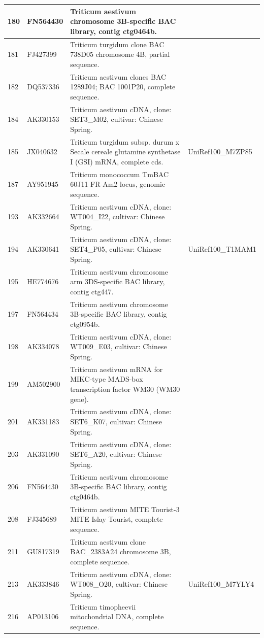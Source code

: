 \documentclass[10.9pt]{article} %
\begin{document}
{\begin{longtable}{|p{1.5cm}|p{2cm}|p{9cm}|p{3cm}|}
\hline
180 & FN564430 & Triticum aestivum chromosome 3B-specific BAC library, contig ctg0464b. & \\
\hline
181 & FJ427399 & Triticum turgidum clone BAC 738D05 chromosome 4B, partial sequence. & \\
\hline
182 & DQ537336 & Triticum aestivum clones BAC 1289J04; BAC 1001P20, complete sequence. & \\
\hline
184 & AK330153 & Triticum aestivum cDNA, clone: SET3\_M02, cultivar: Chinese Spring. & \\
\hline
185 & JX040632 & Triticum turgidum subsp. durum x Secale cereale glutamine synthetase I (GSI) mRNA, complete cds. & UniRef100\_M7ZP85\\
\hline
187 & AY951945 & Triticum monococcum TmBAC 60J11 FR-Am2 locus, genomic sequence. & \\
\hline
193 & AK332664 & Triticum aestivum cDNA, clone: WT004\_I22, cultivar: Chinese Spring. & \\
\hline
194 & AK330641 & Triticum aestivum cDNA, clone: SET4\_P05, cultivar: Chinese Spring. & UniRef100\_T1MAM1\\
\hline
195 & HE774676 & Triticum aestivum chromosome arm 3DS-specific BAC library, contig ctg447. & \\
\hline
197 & FN564434 & Triticum aestivum chromosome 3B-specific BAC library, contig ctg0954b. & \\
\hline
198 & AK334078 & Triticum aestivum cDNA, clone: WT009\_E03, cultivar: Chinese Spring. & \\
\hline
199 & AM502900 & Triticum aestivum mRNA for MIKC-type MADS-box transcription factor WM30 (WM30 gene). & \\
\hline
201 & AK331183 & Triticum aestivum cDNA, clone: SET6\_K07, cultivar: Chinese Spring. & \\
\hline
203 & AK331090 & Triticum aestivum cDNA, clone: SET6\_A20, cultivar: Chinese Spring. & \\
\hline
206 & FN564430 & Triticum aestivum chromosome 3B-specific BAC library, contig ctg0464b. & \\
\hline
208 & FJ345689 & Triticum aestivum MITE Tourist-3 MITE Islay Tourist, complete sequence. & \\
\hline
211 & GU817319 & Triticum aestivum clone BAC\_2383A24 chromosome 3B, complete sequence. & \\
\hline
213 & AK333846 & Triticum aestivum cDNA, clone: WT008\_O20, cultivar: Chinese Spring. & UniRef100\_M7YLY4\\
\hline
216 & AP013106 & Triticum timopheevii mitochondrial DNA, complete sequence. & \\

\end{longtable}}
\end{document}
